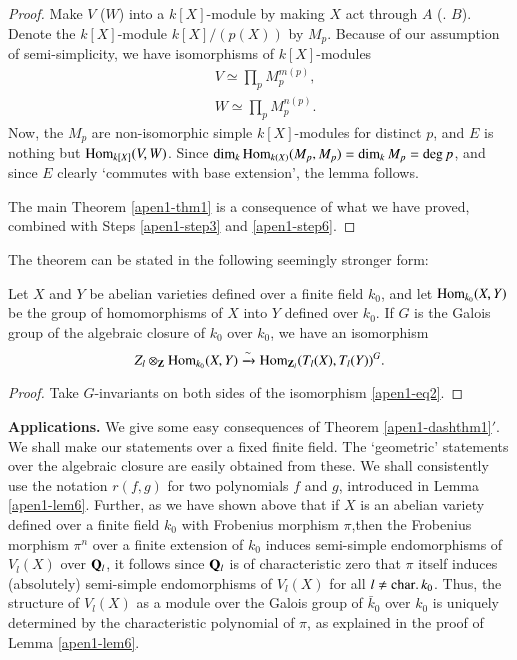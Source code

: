 \begin{proof}
Make $V$ (\resp $W$) into a $k[X]$-module by making $X$ act through $A$ (\resp. $B$). Denote the $k[X]$-module $k[X]/(p(X))$ by $M_p$. Because of our assumption of semi-simplicity, we have isomorphisms of $k[X]$-modules
\begin{align*}
& V \simeq \prod\limits_p M^{m(p)}_p,\\
& W \simeq \prod\limits_p M^{n(p)}_p.
\end{align*}
Now, the $M_p$ are non-isomorphic simple $k[X]$-modules for distinct $p$, and $E$ is nothing but $\operatorname{Hom}_{k[X]} (V,W)$. Since $\dim_k \operatorname{Hom}_{k(X)} (M_p, M_p) = \dim_k M_p = \deg p$, and since $E$ clearly `commutes with base extension', the lemma follows.

The main Theorem \ref{apen1-thm1} is a consequence of what we have proved, combined with Steps \ref{apen1-step3} and \ref{apen1-step6}.
\end{proof}

\begin{remark*}
The theorem can be stated in the following seemingly stronger form:
\end{remark*}

\begin{dashthm}\label{apen1-dashthm1}
Let $X$ and $Y$ be abelian varieties defined over a finite field $k_0$, and let $\operatorname{Hom}_{k_0} (X,Y)$ be the group of homomorphisms of $X$ into $Y$ defined over $k_0$. If $G$ is the Galois group of the algebraic closure of $k_0$ over $k_0$, we have an isomorphism
$$
Z_l \otimes_{\mathbf{Z}} \operatorname{Hom}_{k_0} (X,Y) \xrightarrow{\sim} \operatorname{Hom}_{\mathbf{Z}_l} (T_l (X), T_l (Y))^G.
$$
\end{dashthm} 

\begin{proof}
Take $G$-invariants on both sides of the isomorphism \eqref{apen1-eq2}.
\end{proof}

{\bf Applications.} We give some easy consequences of Theorem \ref{apen1-dashthm1}$'$. We shall make our statements over a fixed finite field. The `geometric' statements over the algebraic closure are easily obtained from these. We shall consistently use the notation $r(f,g)$ for two polynomials $f$ and $g$, introduced in Lemma \ref{apen1-lem6}. Further, as we have shown above that if $X$ is an abelian variety defined over a finite field $k_0$ with Frobenius morphism $\pi$,\pageoriginale then the Frobenius morphism $\pi^n$ over a finite extension of $k_0$ induces semi-simple endomorphisms of $V_l(X)$ over $\mathbf{Q}_l$, it follows since $\mathbf{Q}_l$ is of characteristic zero that $\pi$ itself induces (absolutely) semi-simple endomorphisms of $V_l(X)$ for all $l \neq \operatorname{char} \ldotp k_0$. Thus, the structure of $V_l(X)$ as a module over the Galois group of $\bar{k}_0$ over $k_0$ is uniquely determined by the characteristic polynomial of $\pi$, as explained in the proof of Lemma \ref{apen1-lem6}.

